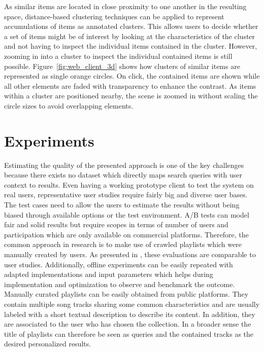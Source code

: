 \documentclass[sigconf]{acmart}
\begin{document}
As similar items are located in close proximity to one another in the resulting space, distance-based clustering techniques can be applied to represent accumulations of items as annotated clusters. This allows users to decide whether a set of items might be of interest by looking at the characteristics of the cluster and not having to inspect the individual items contained in the cluster. However, zooming in into a cluster to inspect the individual contained items is still possible. Figure~\ref{fig:web_client_3d} shows how clusters of similar items are represented as single orange circles. On click, the contained items are shown while all other elements are faded with transparency to enhance the contrast. As items within a cluster are positioned nearby, the scene  is zoomed in without scaling the circle sizes to avoid overlapping elements.


\section{Experiments}
\label{sec:experiments}
Estimating the quality of the presented approach is one of the key challenges because there exists no dataset which directly maps search queries with user context to results. Even having a working prototype client to test the system on real users, representative user studies require fairly big and diverse user bases. The test cases need to allow the users to estimate the results without being biased through available options or the test environment. A/B tests can model fair and solid results but require scopes in terms of number of users and participation which are only available on commercial platforms. Therefore, the common approach in research is to make use of crawled playlists which were manually created by users. As presented in \cite{kamehkhosh2017user}, these evaluations are comparable to user studies. Additionally, offline experiments can be easily repeated with adapted implementations and input parameters which helps during implementation and optimization to observe and benchmark the outcome. \\

Manually curated playlists can be easily obtained from public platforms. They contain multiple song tracks sharing some common characteristics and are usually labeled with a short textual description to describe its content. In addition, they are associated to the user who has chosen the collection. In a broader sense the title of playlists can therefore be seen as queries and the contained tracks as the desired personalized results. 
\end{document}
